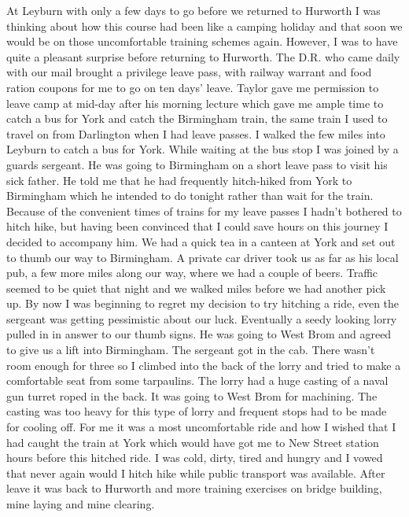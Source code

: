 At Leyburn with only a few days to go before we returned to Hurworth I
was thinking about how this course had been like a camping holiday and
that soon we would be on those uncomfortable training schemes again.
However, I was to have quite a pleasant surprise before returning to
Hurworth. The D.R. who came daily with our mail brought a privilege
leave pass, with railway warrant and food ration coupons for me to go
on ten days' leave. \Lieutenant Taylor gave me permission to leave
camp at mid-day after his morning lecture which gave me ample time to
catch a bus for York and catch the Birmingham train, the same train I
used to travel on from Darlington when I had leave passes. I walked
the few miles into Leyburn to catch a bus for York. While waiting at
the bus stop I was joined by a guards sergeant. He was going to
Birmingham on a short leave pass to visit his sick father. He told me
that he had frequently hitch-hiked from York to Birmingham which he
intended to do tonight rather than wait for the train. Because of the
convenient times of trains for my leave passes I hadn't bothered to
hitch hike, but having been convinced that I could save hours on this
journey I decided to accompany him. We had a quick tea in a canteen
at York and set out to thumb our way to Birmingham. A private car
driver took us as far as his local pub, a few more miles along our
way, where we had a couple of beers. Traffic seemed to be quiet that
night and we walked miles before we had another pick up. By now I was
beginning to regret my decision to try hitching a ride, even the
sergeant was getting pessimistic about our luck. Eventually a seedy
looking lorry pulled in in answer to our thumb signs. He was going to
West Brom and agreed to give us a lift into Birmingham. The sergeant
got in the cab. There wasn't room enough for three so I climbed into
the back of the lorry and tried to make a comfortable seat from some
tarpaulins. The lorry had a huge casting of a naval gun turret roped
in the back. It was going to West Brom for machining. The casting was
too heavy for this type of lorry and frequent stops had to be
made for cooling off. For me it was a most uncomfortable ride and how
I wished that I had caught the train at York which would have got me
to New Street station hours before this hitched ride. I was cold,
dirty, tired and hungry and I vowed that never again would I hitch
hike while public transport was available. After leave it was back to
Hurworth and more training exercises on bridge building, mine laying
and mine clearing.

